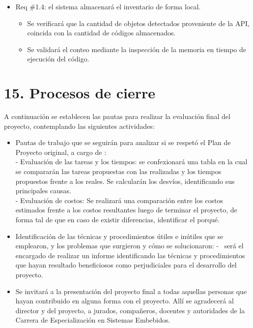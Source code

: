 \documentclass[
11pt, %
codirector, %
]{charter}
\begin{document}
\begin{itemize}
\item Req \#1.4: el sistema almacenará el inventario de forma local.

\begin{itemize}
	\item Se verificará que la cantidad de objetos detectados proveniente de la API, coincida con la cantidad de códigos almacenados.
	\item Se validará el conteo mediante la inspección de la memoria en tiempo de ejecución del código.
\end{itemize}



\end{itemize}


\section{15. Procesos de cierre}    
\label{sec:cierre}

A continuación se establecen las pautas para realizar la evaluación final del proyecto, contemplando las siguientes actividades:

\begin{itemize}
	\item Pautas de trabajo que se seguirán para analizar si se respetó el Plan de Proyecto original, a cargo de \authorname:\\
	 - Evaluación de las tareas y los tiempos: se confexionará una tabla en la cual se compararán las tareas propuestas con las realizadas y los tiempos propuestos frente a los reales. Se calcularán los desvíos, identificando sus principales causas.\\
  - Evaluación de costos: Se realizará una comparación entre los costos estimados frente a los costos resultantes luego de terminar el proyecto, de forma tal de que en caso de existir diferencias, identificar el porqué.
	\item Identificación de las técnicas y procedimientos útiles e inútiles que se emplearon, y los problemas que surgieron y cómo se solucionaron:
	 - \authorname \ será el encargado de realizar  un informe identificando las técnicas y procedimientos que hayan resultado beneficiosos como perjudiciales para el desarrollo del proyecto.
	\item Se invitará a la presentación del proyecto final a todas aquellas personas que hayan contribuido en alguna forma con el  proyecto. Allí se agradecerá al director y del proyecto, a jurados, compañeros, docentes y autoridades de la Carrera de Especialización en Sistemas Embebidos.
\end{itemize}
\end{document}
